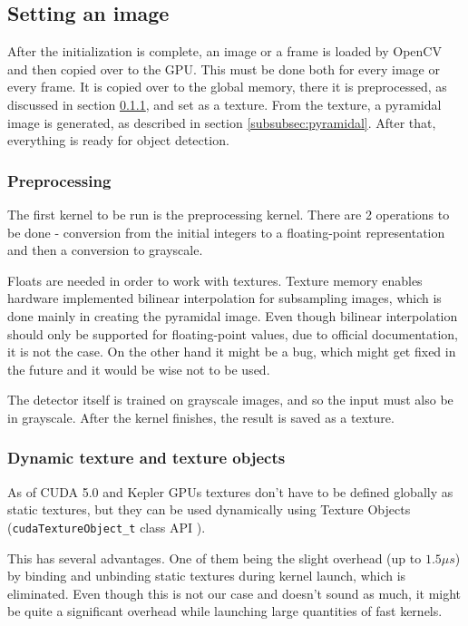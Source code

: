 \subsection{Setting an image}

After the initialization is complete, an image or a frame is loaded by OpenCV and then copied over to the GPU. This must be done both for every image or every frame. It is copied over to the global memory, there it is preprocessed, as discussed in section \ref{subsubsec:grayscale}, and set as a texture. From the texture, a pyramidal image is generated, as described in section \ref{subsubsec:pyramidal}. After that, everything is ready for object detection.

\subsubsection{Preprocessing} \label{subsubsec:grayscale} 

The first kernel to be run is the preprocessing kernel. There are 2 operations to be done - conversion from the initial integers to a floating-point representation and then a conversion to grayscale.

Floats are needed in order to work with textures. Texture memory enables hardware implemented bilinear interpolation for subsampling images, which is done mainly in creating the pyramidal image. Even though bilinear interpolation should only be supported for floating-point values, due to official documentation, it is not the case. On the other hand it might be a bug, which might get fixed in the future and it would be wise not to be used.

The detector itself is trained on grayscale images, and so the input must also be in grayscale. After the kernel finishes, the result is saved as a texture.

\subsubsection{Dynamic texture and texture objects}\label{subsubsec:dynamic-texture}

As of CUDA 5.0 and Kepler GPUs textures don't have to be defined globally as static textures, but they can be used dynamically using Texture Objects (\verb|cudaTextureObject_t| class API \cite{cuda-texture-obj}).

This has several advantages. One of them being the slight overhead (up to $1.5 \mu s$) by binding and unbinding static textures during kernel launch, which is eliminated. Even though this is not our case and doesn't sound as much, it might be quite a significant overhead while launching large quantities of fast kernels.


